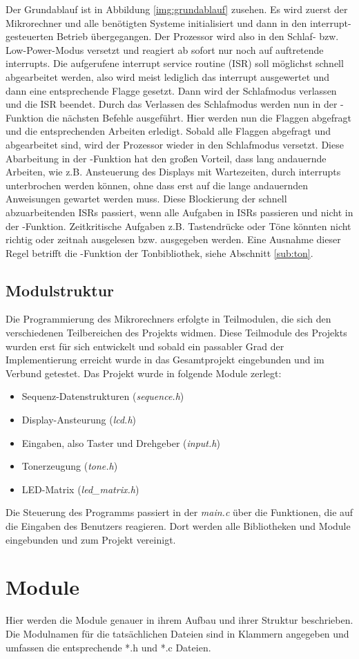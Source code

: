 \newline
Der Grundablauf ist in Abbildung \ref{img:grundablauf} zusehen. Es wird zuerst der Mikrorechner und alle benötigten Systeme initialisiert und dann in den interrupt-gesteuerten Betrieb übergegangen. Der Prozessor wird also in den Schlaf- bzw. Low-Power-Modus versetzt und reagiert ab sofort nur noch auf auftretende interrupts. Die aufgerufene interrupt service routine (ISR) soll möglichst schnell abgearbeitet werden, also wird meist lediglich das interrupt ausgewertet und dann eine entsprechende Flagge gesetzt. Dann wird der Schlafmodus verlassen und die ISR beendet. Durch das Verlassen des Schlafmodus werden nun in der -Funktion die nächsten Befehle ausgeführt. Hier werden nun die Flaggen abgefragt und die entsprechenden Arbeiten erledigt. Sobald alle Flaggen abgefragt und abgearbeitet sind, wird der Prozessor wieder in den Schlafmodus versetzt. Diese Abarbeitung in der -Funktion hat den großen Vorteil, dass lang andauernde Arbeiten, wie z.B. Ansteuerung des Displays mit Wartezeiten, durch interrupts unterbrochen werden können, ohne dass erst auf die lange andauernden Anweisungen gewartet werden muss. Diese Blockierung der schnell abzuarbeitenden ISRs passiert, wenn alle Aufgaben in ISRs passieren und nicht in der -Funktion. Zeitkritische Aufgaben z.B. Tastendrücke oder Töne könnten nicht richtig oder zeitnah ausgelesen bzw. ausgegeben werden. Eine Ausnahme dieser Regel betrifft die -Funktion der Tonbibliothek, siehe Abschnitt \ref{sub:ton}.%

\subsection{Modulstruktur}
Die Programmierung des Mikrorechners erfolgte in Teilmodulen, die sich den verschiedenen Teilbereichen des Projekts widmen. Diese Teilmodule des Projekts wurden erst für sich entwickelt und sobald ein passabler Grad der Implementierung erreicht wurde in das Gesamtprojekt eingebunden und im Verbund getestet. Das Projekt wurde in folgende Module zerlegt:
\begin{itemize}
    \item Sequenz-Datenstrukturen (\textsl{sequence.h})
	\item Display-Ansteurung (\textsl{lcd.h})
	\item Eingaben, also Taster und Drehgeber (\textsl{input.h})
	\item Tonerzeugung (\textsl{tone.h})
	\item LED-Matrix (\textsl{led\_matrix.h})
\end{itemize}
Die Steuerung des Programms passiert in der \textsl{main.c} über die Funktionen, die auf die Eingaben des Benutzers reagieren. Dort werden alle Bibliotheken und Module eingebunden und zum Projekt vereinigt.

\section{Module}
Hier werden die Module genauer in ihrem Aufbau und ihrer Struktur beschrieben. Die Modulnamen für die tatsächlichen Dateien sind in Klammern angegeben und umfassen die entsprechende *.h und *.c Dateien.
